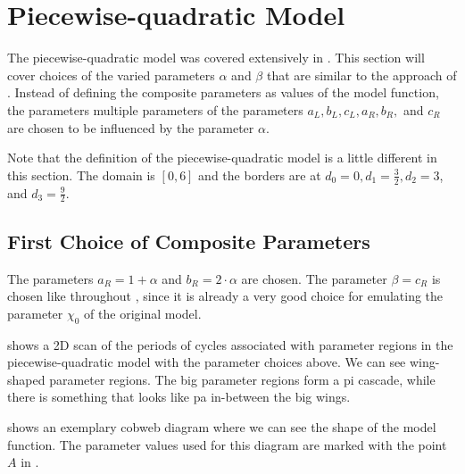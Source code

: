 \section{Piecewise-quadratic Model}

The piecewise-quadratic model was covered extensively in .
This section will cover choices of the varied parameters $\alpha$ and $\beta$ that are similar to the approach of .
Instead of defining the composite parameters as values of the model function, the parameters multiple parameters of the parameters $a_L, b_L, c_L, a_R, b_R,$ and $c_R$ are chosen to be influenced by the parameter $\alpha$.

Note that the definition of the piecewise-quadratic model is a little different in this section.
The domain is $[0, 6]$ and the borders are at $d_0 = 0, d_1 = \frac{3}{2}, d_2 = 3$, and $d_3 = \frac{9}{2}$.

\subsection{First Choice of Composite Parameters}

The parameters $a_R = 1 + \alpha$ and $b_R = 2 \cdot \alpha$ are chosen.
The parameter $\beta = c_R$ is chosen like throughout , since it is already a very good choice for emulating the parameter $\chi_0$ of the original model.

 shows a 2D scan of the periods of cycles associated with parameter regions in the piecewise-quadratic model with the parameter choices above.
We can see wing-shaped parameter regions.
The big parameter regions form a \gls{pi} cascade, while there is something that looks like \gls{pa} in-between the big wings.

 shows an exemplary cobweb diagram where we can see the shape of the model function.
The parameter values used for this diagram are marked with the point $A$ in .

